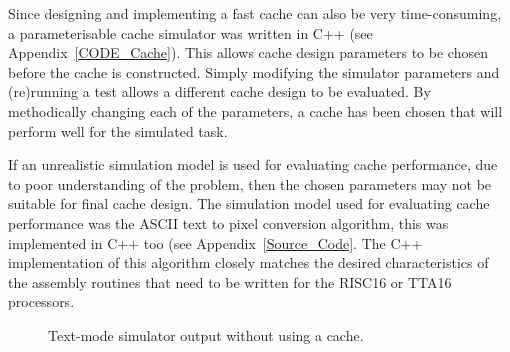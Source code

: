 Since designing and implementing a fast cache can also be very time-consuming, a
parameterisable cache simulator was written in C++ (see
Appendix~\ref{CODE_Cache}). This allows cache design parameters to be chosen
before the cache is constructed. Simply modifying the simulator parameters and
(re)running a test allows a different cache design to be evaluated. By
methodically changing each of the parameters, a cache has been chosen that will
perform well for the simulated task.

If an unrealistic simulation model is used for evaluating cache performance, due
to poor understanding of the problem, then the chosen parameters may not be
suitable for final cache design. The simulation model used for evaluating cache
performance was the ASCII text to pixel conversion algorithm, this was
implemented in C++ too (see Appendix~\ref{Source_Code}. The C++
implementation of this algorithm closely matches the desired characteristics of
the assembly routines that need to be written for the RISC16 or TTA16 processors.


\begin{figure}[h!]
\begin{center}
\caption[Text-mode simulator without a cache]{Text-mode simulator output without
using a cache.}
\label{Mem_No_Cache}
\end{center}
\end{figure}

